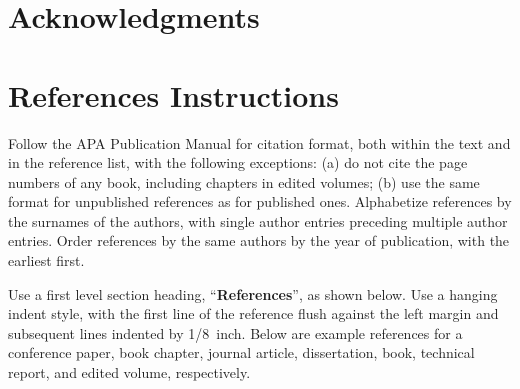 \documentclass[10pt,letterpaper]{article}
\begin{document}
\section{Acknowledgments}


\section{References Instructions}

Follow the APA Publication Manual for citation format, both within the
text and in the reference list, with the following exceptions: (a) do
not cite the page numbers of any book, including chapters in edited
volumes; (b) use the same format for unpublished references as for
published ones. Alphabetize references by the surnames of the authors,
with single author entries preceding multiple author entries. Order
references by the same authors by the year of publication, with the
earliest first.

Use a first level section heading, ``{\bf References}'', as shown
below. Use a hanging indent style, with the first line of the
reference flush against the left margin and subsequent lines indented
by 1/8~inch. Below are example references for a conference paper, book
chapter, journal article, dissertation, book, technical report, and
edited volume, respectively.

\nocite{ChalnickBillman1988a}
\nocite{Feigenbaum1963a}
\nocite{Hill1983a}
\nocite{OhlssonLangley1985a}
\nocite{Matlock2001}
\nocite{NewellSimon1972a}
\nocite{ShragerLangley1990a}




\setlength{\bibleftmargin}{.125in}
\setlength{\bibindent}{-\bibleftmargin}


\end{document}
